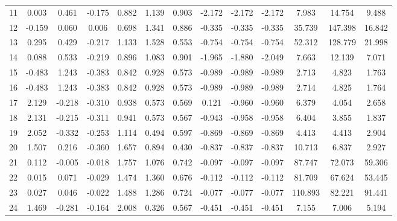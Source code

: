\begin{table}
\begin{tabular}{c | c c c | c c c | c c c | c c c }
            \multicolumn{1}{c|}{11} & 0.003  & 0.461  & -0.175 & 0.882 & 1.139 & 0.903 & -2.172 & -2.172 & -2.172 & 7.983   & 14.754  & 9.488  \\
            \multicolumn{1}{c|}{12} & -0.159 & 0.060  & 0.006  & 0.698 & 1.341 & 0.886 & -0.335 & -0.335 & -0.335 & 35.739  & 147.398 & 16.842 \\
            \multicolumn{1}{c|}{13} & 0.295  & 0.429  & -0.217 & 1.133 & 1.528 & 0.553 & -0.754 & -0.754 & -0.754 & 52.312  & 128.779 & 21.998 \\
            \multicolumn{1}{c|}{14} & 0.088  & 0.533  & -0.219 & 0.896 & 1.083 & 0.901 & -1.965 & -1.880 & -2.049 & 7.663   & 12.139  & 7.071  \\
            \multicolumn{1}{c|}{15} & -0.483 & 1.243  & -0.383 & 0.842 & 0.928 & 0.573 & -0.989 & -0.989 & -0.989 & 2.713   & 4.823   & 1.763  \\
            \multicolumn{1}{c|}{16} & -0.483 & 1.243  & -0.383 & 0.842 & 0.928 & 0.573 & -0.989 & -0.989 & -0.989 & 2.714   & 4.825   & 1.764  \\
            \multicolumn{1}{c|}{17} & 2.129  & -0.218 & -0.310 & 0.938 & 0.573 & 0.569 & 0.121  & -0.960 & -0.960 & 6.379   & 4.054   & 2.658  \\
            \multicolumn{1}{c|}{18} & 2.131  & -0.215 & -0.311 & 0.941 & 0.573 & 0.567 & -0.943 & -0.958 & -0.958 & 6.404   & 3.855   & 1.837  \\
            \multicolumn{1}{c|}{19} & 2.052  & -0.332 & -0.253 & 1.114 & 0.494 & 0.597 & -0.869 & -0.869 & -0.869 & 4.413   & 4.413   & 2.904  \\
            \multicolumn{1}{c|}{20} & 1.507  & 0.216  & -0.360 & 1.657 & 0.894 & 0.430 & -0.837 & -0.837 & -0.837 & 10.713  & 6.837   & 2.927  \\
            \multicolumn{1}{c|}{21} & 0.112  & -0.005 & -0.018 & 1.757 & 1.076 & 0.742 & -0.097 & -0.097 & -0.097 & 87.747  & 72.073  & 59.306 \\
            \multicolumn{1}{c|}{22} & 0.015  & 0.071  & -0.029 & 1.474 & 1.360 & 0.676 & -0.112 & -0.112 & -0.112 & 81.709  & 67.624  & 53.445 \\
            \multicolumn{1}{c|}{23} & 0.027  & 0.046  & -0.022 & 1.488 & 1.286 & 0.724 & -0.077 & -0.077 & -0.077 & 110.893 & 82.221  & 91.441 \\
            \multicolumn{1}{c|}{24} & 1.469  & -0.281 & -0.164 & 2.008 & 0.326 & 0.567 & -0.451 & -0.451 & -0.451 & 7.155   & 7.006   & 5.194 \\\bottomrule
        \end{tabular}
    \end{table}

